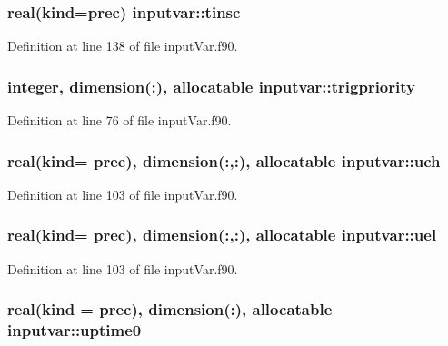 \hypertarget{classinputvar_a3c4fd3f3b8a4ef86969e1e9eec3338c8}{
\subsubsection[{tinsc}]{\setlength{\rightskip}{0pt plus 5cm}real(kind=prec) inputvar\-::tinsc}}\label{classinputvar_a3c4fd3f3b8a4ef86969e1e9eec3338c8}


Definition at line 138 of file input\-Var.\-f90.

\hypertarget{classinputvar_aa06cb5d284b385bcfed4e6f34efa534f}{
\subsubsection[{trigpriority}]{\setlength{\rightskip}{0pt plus 5cm}integer, dimension(\-:), allocatable inputvar\-::trigpriority}}\label{classinputvar_aa06cb5d284b385bcfed4e6f34efa534f}


Definition at line 76 of file input\-Var.\-f90.

\hypertarget{classinputvar_a53339aa6533c8e2333ec3eaa4a54796b}{
\subsubsection[{uch}]{\setlength{\rightskip}{0pt plus 5cm}real(kind= prec), dimension(\-:,\-:), allocatable inputvar\-::uch}}\label{classinputvar_a53339aa6533c8e2333ec3eaa4a54796b}


Definition at line 103 of file input\-Var.\-f90.

\hypertarget{classinputvar_a8540cf286b75c5a77a2c3f8e2623617a}{
\subsubsection[{uel}]{\setlength{\rightskip}{0pt plus 5cm}real(kind= prec), dimension(\-:,\-:), allocatable inputvar\-::uel}}\label{classinputvar_a8540cf286b75c5a77a2c3f8e2623617a}


Definition at line 103 of file input\-Var.\-f90.

\hypertarget{classinputvar_a3938be0ea72158eee837e2a8c08f29e0}{
\subsubsection[{uptime0}]{\setlength{\rightskip}{0pt plus 5cm}real(kind = prec), dimension(\-:), allocatable inputvar\-::uptime0}}\label{classinputvar_a3938be0ea72158eee837e2a8c08f29e0}


